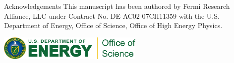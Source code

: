 \documentclass{beamer}
\begin{document}
\begin{frame}{}
\begin{columns}[t]
\begin{column}{0.32\textwidth}
\begin{block}{\label{sec:acknowledgements}Acknowledgements}
                    This manuscript has been authored by Fermi Research Alliance, LLC under Contract No. DE-AC02-07CH11359 with the U.S. Department of Energy, Office of Science, Office of High Energy Physics.

                    \centering \includegraphics[width=7cm]{logos/RGB_Color-Seal_Green-Mark_SC_Horizontal.png}
                \end{block}
            \end{column}
        \end{columns}
    \end{frame}
\end{document}
